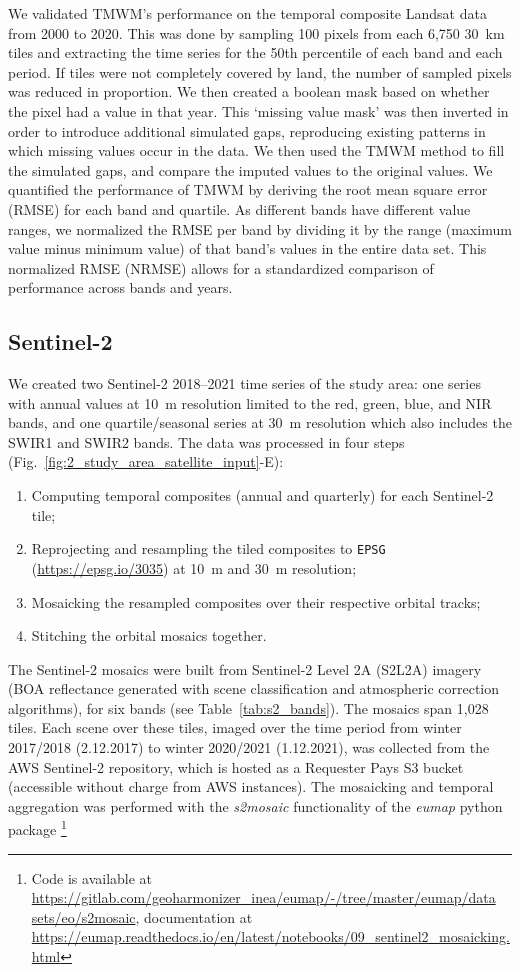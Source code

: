 We validated TMWM's performance on the temporal composite Landsat data from 2000 to 2020. This was done by sampling 100 pixels from each 6,750 30~km tiles and extracting the time series for the 50th percentile of each band and each period. If tiles were not completely covered by land, the number of sampled pixels was reduced in proportion. We then created a boolean mask based on whether the pixel had a value in that year. This `missing value mask' was then inverted in order to introduce additional simulated gaps, reproducing existing patterns in which missing values occur in the data. We then used the TMWM method to fill the simulated gaps, and compare the imputed values to the original values. We quantified the performance of TMWM by deriving the root mean square error (RMSE) for each band and quartile. As different bands have different value ranges, we normalized the RMSE per band by dividing it by the range (maximum value minus minimum value) of that band's values in the entire data set. This normalized RMSE (NRMSE) allows for a standardized comparison of performance across bands and years.

\subsection*{Sentinel-2}

We created two Sentinel-2 2018--2021 time series of the study area: one series with annual values at 10~m resolution limited to the red, green, blue, and NIR bands, and one quartile/seasonal series at 30~m resolution which also includes the SWIR1 and SWIR2 bands. The data was processed in four steps (Fig.\@~\ref{fig:2_study_area_satellite_input}-E):
\begin{enumerate}
\item Computing temporal composites (annual and quarterly) for each Sentinel-2 tile;
\item Reprojecting and resampling the tiled composites to \texttt{EPSG} (\url{https://epsg.io/3035}) at 10~m and 30~m resolution;
\item Mosaicking the resampled composites over their respective orbital tracks;
\item Stitching the orbital mosaics together.
\end{enumerate}

The Sentinel-2 mosaics were built from Sentinel-2 Level 2A (S2L2A) imagery (BOA reflectance generated with scene classification and atmospheric correction algorithms), for six bands (see Table\@~\ref{tab:s2_bands}). The mosaics span 1,028 tiles. Each scene over these tiles, imaged over the time period from winter 2017/2018 (2.12.2017) to winter 2020/2021 (1.12.2021), was collected from the AWS Sentinel-2 repository, which is hosted as a Requester Pays S3 bucket (accessible without charge from AWS instances). The mosaicking and temporal aggregation was performed with the \emph{s2mosaic} functionality of the \emph{eumap} python package \footnote{Code is available at \url{https://gitlab.com/geoharmonizer_inea/eumap/-/tree/master/eumap/data sets/eo/s2mosaic}, documentation at \url{https://eumap.readthedocs.io/en/latest/notebooks/09_sentinel2_mosaicking.html}}

